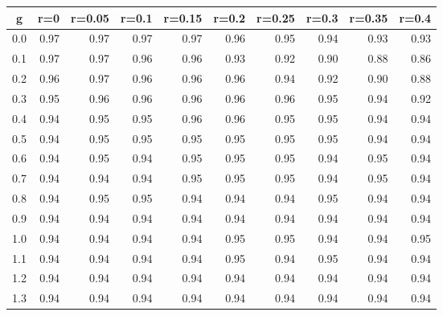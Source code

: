 %
\begin{table}[!tbp]
 \begin{center}
 \begin{tabular}{rrrrrrrrrr}\hline\hline
\multicolumn{1}{c}{g}&\multicolumn{1}{c}{r=0}&\multicolumn{1}{c}{r=0.05}&\multicolumn{1}{c}{r=0.1}&\multicolumn{1}{c}{r=0.15}&\multicolumn{1}{c}{r=0.2}&\multicolumn{1}{c}{r=0.25}&\multicolumn{1}{c}{r=0.3}&\multicolumn{1}{c}{r=0.35}&\multicolumn{1}{c}{r=0.4}\tabularnewline
\hline
0.0&0.97&0.97&0.97&0.97&0.96&0.95&0.94&0.93&0.93\tabularnewline
0.1&0.97&0.97&0.96&0.96&0.93&0.92&0.90&0.88&0.86\tabularnewline
0.2&0.96&0.97&0.96&0.96&0.96&0.94&0.92&0.90&0.88\tabularnewline
0.3&0.95&0.96&0.96&0.96&0.96&0.96&0.95&0.94&0.92\tabularnewline
0.4&0.94&0.95&0.95&0.96&0.96&0.95&0.95&0.94&0.94\tabularnewline
0.5&0.94&0.95&0.95&0.95&0.95&0.95&0.95&0.94&0.94\tabularnewline
0.6&0.94&0.95&0.94&0.95&0.95&0.95&0.94&0.95&0.94\tabularnewline
0.7&0.94&0.94&0.94&0.95&0.95&0.95&0.94&0.95&0.94\tabularnewline
0.8&0.94&0.95&0.95&0.94&0.94&0.94&0.95&0.94&0.94\tabularnewline
0.9&0.94&0.94&0.94&0.94&0.94&0.94&0.94&0.94&0.94\tabularnewline
1.0&0.94&0.94&0.94&0.94&0.95&0.95&0.94&0.94&0.95\tabularnewline
1.1&0.94&0.94&0.94&0.94&0.95&0.94&0.95&0.94&0.94\tabularnewline
1.2&0.94&0.94&0.94&0.94&0.94&0.94&0.94&0.94&0.94\tabularnewline
1.3&0.94&0.94&0.94&0.94&0.94&0.94&0.94&0.94&0.94\tabularnewline
\hline
\end{tabular}

\end{center}

\end{table}

